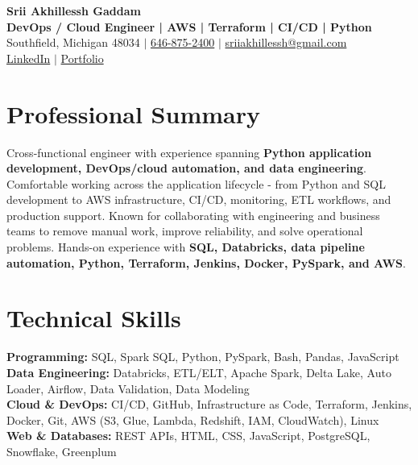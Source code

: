 \documentclass[letterpaper,10pt]{article}
\begin{document}
\fontsize{9.35pt}{10.45pt}\selectfont

\begin{center}
    {\LARGE \textbf{Srii Akhillessh Gaddam}} \\[-1pt]
    \textbf{DevOps / Cloud Engineer | AWS | Terraform | CI/CD | Python} \\[2pt]
    Southfield, Michigan 48034 $|$
    \href{tel:6468752400}{646-875-2400} $|$
    \href{mailto:sriiakhillessh@gmail.com}{sriiakhillessh@gmail.com} \\[1pt]
    \href{https://www.linkedin.com/in/srii-akhiilessh-gaddam-b48668191/}{LinkedIn} $|$
    \href{https://sriiakhillesshg.github.io/portfolio/}{Portfolio}
\end{center}
\vspace{-8pt}

\section{Professional Summary}
\small{Cross-functional engineer with experience spanning \textbf{Python application development, DevOps/cloud automation, and data engineering}. Comfortable working across the application lifecycle - from Python and SQL development to AWS infrastructure, CI/CD, monitoring, ETL workflows, and production support. Known for collaborating with engineering and business teams to remove manual work, improve reliability, and solve operational problems. Hands-on experience with \textbf{SQL, Databricks, data pipeline automation, Python, Terraform, Jenkins, Docker, PySpark, and AWS}.}

\section{Technical Skills}
\small{
\textbf{Programming:} SQL, Spark SQL, Python, PySpark, Bash, Pandas, JavaScript \\
\textbf{Data Engineering:} Databricks, ETL/ELT, Apache Spark, Delta Lake, Auto Loader, Airflow, Data Validation, Data Modeling \\
\textbf{Cloud \& DevOps:} CI/CD, GitHub, Infrastructure as Code, Terraform, Jenkins, Docker, Git, AWS (S3, Glue, Lambda, Redshift, IAM, CloudWatch), Linux \\
\textbf{Web \& Databases:} REST APIs, HTML, CSS, JavaScript, PostgreSQL, Snowflake, Greenplum
}
\end{document}
